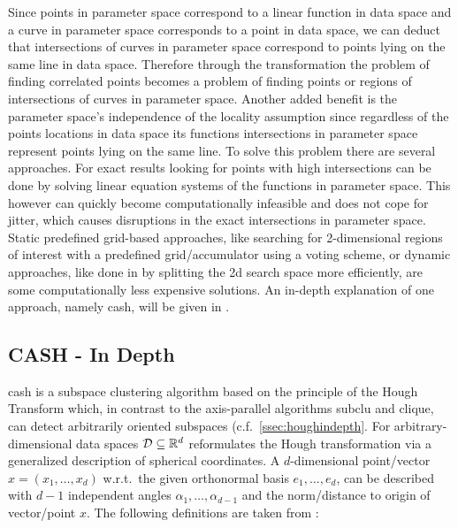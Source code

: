 Since points in parameter space correspond to a linear function in data space and a curve in parameter space corresponds to a point in data space, we can deduct that intersections of curves in parameter space correspond to points lying on the same line in data space. Therefore through the transformation the problem of finding correlated points becomes a problem of finding points or regions of intersections of curves in parameter space. Another added benefit is the parameter space's independence of the locality assumption since regardless of the points locations in data space its functions intersections in parameter space represent points lying on the same line.  To solve this problem there are several approaches. For exact results looking for points with high intersections can be done by solving linear equation systems of the functions in parameter space. This however can quickly become computationally infeasible and does not cope for jitter, which causes disruptions in the exact intersections in parameter space. Static predefined grid-based approaches, like searching for 2-dimensional regions of interest with a predefined grid/accumulator using a voting scheme, or dynamic approaches, like done in \textcite{CASHachtert2008global} by splitting the 2d search space more efficiently, are some computationally less expensive solutions. An in-depth explanation of one approach, namely \acrfull{cash}, will be given in .

\subsection{CASH - In Depth}\label{ssec:CASHindepth}
\acrfull{cash} is a subspace clustering algorithm based on the principle of the Hough Transform which, in contrast to the axis-parallel algorithms \acrshort{subclu}\cite{sublcukailing2004density} and \acrshort{clique}\cite{cliqueagrawal1998automatic}, can detect arbitrarily oriented subspaces (c.f.~\autoref{ssec:houghindepth}. 
For arbitrary-dimensional data spaces $\mathcal{D} \subseteq \mathbb{R}^d$ \textcite{CASHachtert2008robust} reformulates the Hough transformation via a generalized description of spherical coordinates. A $d$-dimensional point/vector $x=(x_1,\dotsc,x_d)$ w.r.t.\ the given orthonormal basis $e_1,\dotsc,e_d$, can be described with $d-1$ independent angles $\alpha_1,\dotsc,\alpha_{d-1}$ and the norm/distance to origin of vector/point $x$. The following definitions are taken from \cite{CASHachtert2008robust}:

